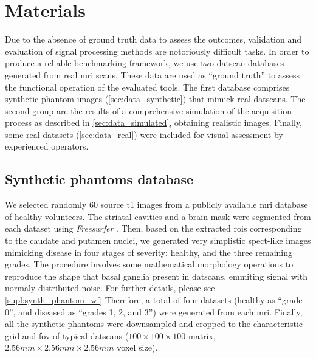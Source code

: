 \documentclass{frontiers}
\begin{document}
\section{Materials}\label{sec:data}

Due to the absence of ground truth data to assess the outcomes, validation and evaluation 
  of signal processing methods are notoriously difficult tasks.
\cbstart
In order to produce a reliable benchmarking framework, we use two 
  \gls*{datscan} databases generated from real \gls*{mri} scans.
These data are used as ``ground truth'' to assess the functional operation
  of the evaluated tools.
The first database comprises synthetic phantom images (\autoref{sec:data_synthetic})
  that mimick real \glspl*{datscan}.
The second group are the results of a comprehensive simulation of the acquisition 
  process as described in \autoref{sec:data_simulated}, obtaining realistic images.
Finally, some real datasets (\autoref{sec:data_real}) were included for visual 
  assessment by experienced operators.
\cbend

\subsection{Synthetic phantoms database} %
\label{sec:data_synthetic}
We selected randomly 60 source \gls*{t1} images from a publicly available
  \gls*{mri} database \citep{hill_ixi_2006} of healthy volunteers.
The striatal cavities and a brain mask were segmented from each dataset
  using \emph{Freesurfer} \citep{fischl_freesurfer_2012}.
Then, based on the extracted \glspl*{roi} corresponding to the caudate and putamen
  nuclei, we generated very simplistic \gls*{spect}-like images mimicking disease in
  four stages of severity: healthy, and the three remaining grades.
\cbstart
The procedure involves some mathematical morphology operations to reproduce the
  shape that basal ganglia present in \glspl*{datscan}, emmiting signal with
  normaly distributed noise.
For further details, please see \autoref{supl:synth_phantom_wf}
\cbend
Therefore, a total of four datasets (healthy as ``grade 0'',
  and diseased as ``grades 1, 2, and 3'') were generated from each \gls*{mri}.
Finally, all the synthetic phantoms were downsampled and cropped to the characteristic
  grid and \acrlong*{fov} of typical \glspl*{datscan} ($100\times100\times100$ matrix,
  $2.56mm\times2.56mm\times2.56mm$ voxel size).
\end{document}
